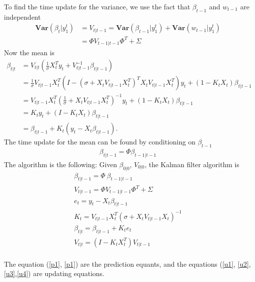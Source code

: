 \documentclass{article}
\theoremstyle{plain}
\theoremstyle{definition}
\theoremstyle{remark}
\newcommand{\Var}{\mathbf{Var}}
\begin{document}
To find the time update for the variance, we use the fact that $\beta_{t-1}$ and $w_{t-1}$ are independent
\begin{equation}
\begin{split}
\Var(\beta_t|y^t_1) &= V_{t|t-1} = \Var(\beta_{t-1}|y^t_1) + \Var(w_{t-1}|y^t_1)\\
&= \Phi V_{t-1|t-1}\Phi ^T + \Sigma
\end{split}
\end{equation}
Now the mean is
\begin{equation}
\begin{split}
\beta_{t|t} &= V_{t|t} ( \frac1\sigma X_t^T y_t + V_{t|t-1}^{-1} \beta_{t|t-1})\\
&= \frac1\sigma V_{t|t-1} X_t^T (I - (\sigma + X_t V_{t|t-1} X_t^T )^T X_t  V_{t|t-1} X_t^T) y_t+ (1-K_t X_t) \beta_{t|t-1}\\
&= V_{t|t-1} X_t^T ( \frac1\sigma + X_t V_{t|t-1} X_t^T)^{-1} y_t + (1-K_t X_t) \beta_{t|t-1}\\
&= K_t y_t + (I - K_t X_t) \beta_{t|t-1}\\
&= \beta_{t|t-1}+ K_t (y_t - X_t \beta_{t|t-1}).
\end{split}
\end{equation}
The time update for the mean can be found by conditioning on $\beta_{t-1}$
\begin{equation}
\begin{split}
\beta_{t|t-1} =\Phi  \beta_{t-1|t-1}
\end{split}
\end{equation}
The algorithm is the following:
Given $\beta_{0|0}$, $V_{0|0}$, the Kalman filter algorithm is
\begin{eqnarray}
\beta_{t|t-1} = \Phi \: \beta_{t-1|t-1}\label{p1}\\
V_{t|t-1} = \Phi  V_{t-1|t-1} \Phi ^T + \Sigma \label{p2}\\
e_t = y_t -  X_t \beta_{t|t-1} \label{u1}\\
K_t =  V_{t|t-1} X_t^T (\sigma + X_t V_{t|t-1} X_t )^{-1}\label{u4}\\
\beta_{t|t} = \beta_{t|t-1} + K_t e_t\label{u2}\\
V_{t|t} = (I - K_t X_t^T) V_{t|t-1}\label{u3}\\
\end{eqnarray}

The equation (\ref{p1}, \ref{p1}) are the prediction equants, and the equations (\ref{u1}, \ref{u2}, \ref{u3},\ref{u4}) are updating equations.
\end{document}
